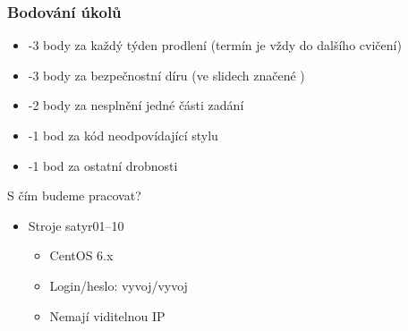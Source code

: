 \begin{frame}
  \frametitle{Bodování úkolů}

  \begin{itemize}
    \item -3 body za každý týden prodlení (termín je vždy do dalšího cvičení)
    \item -3 body za bezpečnostní díru (ve slidech značené \pozor)
    \item -2 body za nesplnění jedné části zadání
    \item -1 bod za kód neodpovídající stylu
    \item -1 bod za ostatní drobnosti
  \end{itemize}

\end{frame}

\begin{frame}{S čím budeme pracovat?}

  \begin{itemize}
    \item Stroje satyr01--10
    \begin{itemize}
      \item CentOS 6.x
      \item Login/heslo: vyvoj/vyvoj
      \item Nemají viditelnou IP
    \end{itemize}
  \end{itemize}

\end{frame}




